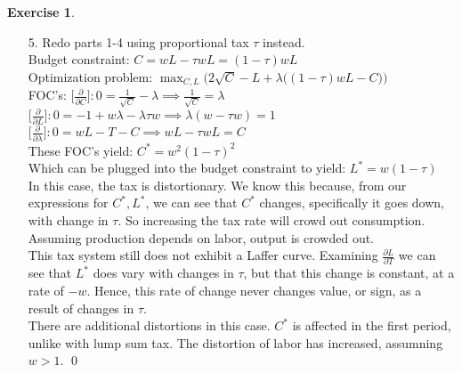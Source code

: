\documentclass[12pt]{article}
\theoremstyle{definition}
\newtheorem{exercise}[theorem]{Exercise}
\newcommand{\V}{\vspace{0.3cm}\\}
\begin{document}
\begin{exercise}
\begin{enumerate}
    \item [5.] Redo parts 1-4 using proportional tax $\tau$ instead. \V
    Budget constraint: $C = wL - \tau wL = (1-\tau)wL$ \V
    Optimization problem: $\displaystyle\max_{C,L} \bigg(2\sqrt{C} - L + \lambda \big((1-\tau)wL - C \big) \bigg)$ \V
    FOC's:  $\Big[ \frac{\partial}{\partial C} \Big] : 0 = \frac{1}{\sqrt{C}} - \lambda \implies \frac{1}{\sqrt{C}} = \lambda $ \V
    $\Big[ \frac{\partial}{\partial L} \Big] : 0 = -1 + w\lambda - \lambda \tau w \implies \lambda(w-\tau w) = 1 $ \V
    $\Big[ \frac{\partial}{\partial \lambda} \Big] : 0 = wL-T-C \implies wL - \tau wL = C$ \V
    These FOC's yield: $C^* = w^2(1-\tau)^2$ \\
    Which can be plugged into the budget constraint to yield: $L^* = w(1-\tau)$ \V
    In this case, the tax is distortionary. We know this because, from our expressions for $C^*, L^*$, we can see that $C^*$ changes, specifically it goes down, with change in $\tau$. So increasing the tax rate will crowd out consumption. Assuming production depends on labor, output is crowded out. \V
    This tax system still does not exhibit a Laffer curve. Examining $\frac{\partial L}{\partial T}$ we can see that $L^*$ does vary with changes in $\tau$, but that this change is constant, at a rate of $-w$. Hence, this rate of change never changes value, or sign, as a result of changes in $\tau$. \V
    There are additional distortions in this case. $C^*$ is affected in the first period, unlike with lump sum tax. The distortion of labor has increased, assumning $w>1 $. \qed
\end{enumerate}
\end{exercise}
\end{document}
